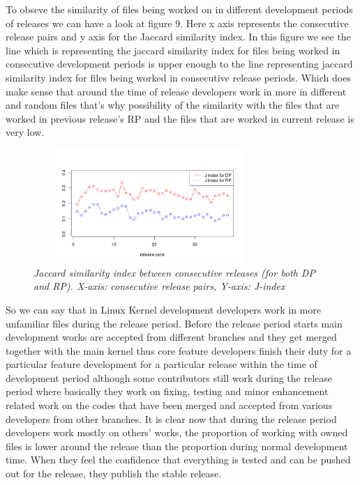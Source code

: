 \documentclass{acm_proc_article-sp}
\begin{document}
To obseve the similarity of files being worked on in different development periods of releases we can have a look at figure 9. Here x axis represents the consecutive release pairs and y axis for the Jaccard similarity index. In this figure we see the line which is representing the jaccard similarity index for files being worked in consecutive development periods is upper enough to the line representing jaccard similarity index for files being worked in consecutive release periods. Which does make sense that around the time of release developers work in more in different and random files that's why possibility of the similarity with the files that are worked in previous release's RP and the files that are worked in current release is very low.
\begin{figure}
\begin{center}
\includegraphics[height=1.7in,width=3.4in]{j_file_MPMPvRPRP.png}
\caption{\small \sl Jaccard similarity index between consecutive releases (for both DP and RP). X-axis: consecutive release pairs, Y-axis: J-index}
\end{center}
\end{figure}
So we can say that in Linux Kernel development developers work in more unfamiliar files during the release period. Before the release period starts main development works are accepted from different branches and they get merged together with the main kernel thus core feature developers finish their duty for a particular feature development for a particular release within the time of development period although some contributors still work during the release period where basically they work on fixing, testing and minor enhancement related work on the codes that have been merged and accepted from various developers from other branches. It is clear now that during the release period developers work mostly on others' works, the proportion of working with owned files is lower around the release than the proportion during normal development time. When they feel the confidence that everything is tested and can be pushed out for the release, they publish the stable release.
\end{document}
